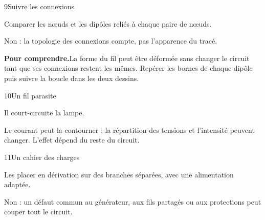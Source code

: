 \par\noindent\begin{minipage}{\linewidth}
\begin{corrige}{9}{Suivre les connexions}
\begin{questions}
\item Comparer les nœuds et les dipôles reliés à chaque paire de nœuds.
\item Non : la topologie des connexions compte, pas l’apparence du tracé.
\end{questions}
\par\smallskip\noindent\textbf{Pour comprendre.}\enspace La forme du fil peut être déformée sans changer le circuit tant que ses connexions restent les mêmes. Repérer les bornes de chaque dipôle puis suivre la boucle dans les deux dessins.\par
{}
\end{corrige}
\end{minipage}
\par\noindent\begin{minipage}{\linewidth}
\begin{corrige}{10}{Un fil parasite}
\begin{questions}
\item Il court-circuite la lampe.
\item Le courant peut la contourner ; la répartition des tensions et l’intensité peuvent changer. L’effet dépend du reste du circuit.
\end{questions}
\end{corrige}
\end{minipage}
\par\noindent\begin{minipage}{\linewidth}
\begin{corrige}{11}{Un cahier des charges}
\begin{questions}
\item Les placer en dérivation sur des branches séparées, avec une alimentation adaptée.
\item Non : un défaut commun au générateur, aux fils partagés ou aux protections peut couper tout le circuit.
\end{questions}
\end{corrige}
\end{minipage}

